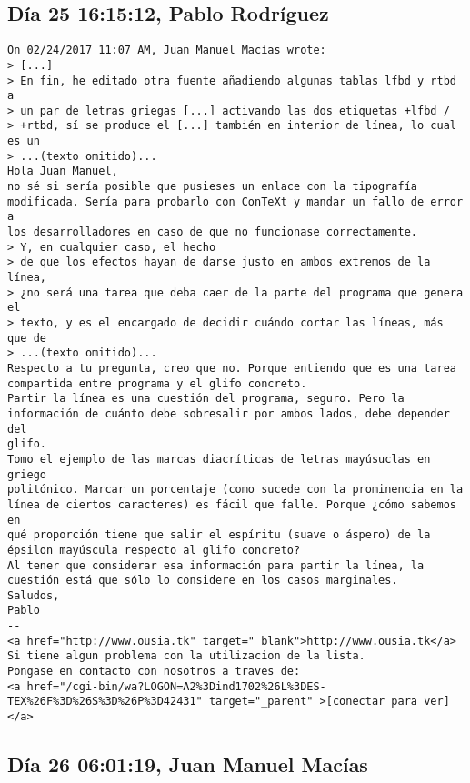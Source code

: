 \documentclass[a4paper,10pt]{article}
\begin{document}
\subsection{Día 25 16:15:12, Pablo Rodríguez}

\begin{lstlisting}
On 02/24/2017 11:07 AM, Juan Manuel Macías wrote:
> [...]
> En fin, he editado otra fuente añadiendo algunas tablas lfbd y rtbd a
> un par de letras griegas [...] activando las dos etiquetas +lfbd /
> +rtbd, sí se produce el [...] también en interior de línea, lo cual es un
> ...(texto omitido)...
Hola Juan Manuel,
no sé si sería posible que pusieses un enlace con la tipografía
modificada. Sería para probarlo con ConTeXt y mandar un fallo de error a
los desarrolladores en caso de que no funcionase correctamente.
> Y, en cualquier caso, el hecho 
> de que los efectos hayan de darse justo en ambos extremos de la línea, 
> ¿no será una tarea que deba caer de la parte del programa que genera el 
> texto, y es el encargado de decidir cuándo cortar las líneas, más que de 
> ...(texto omitido)...
Respecto a tu pregunta, creo que no. Porque entiendo que es una tarea
compartida entre programa y el glifo concreto.
Partir la línea es una cuestión del programa, seguro. Pero la
información de cuánto debe sobresalir por ambos lados, debe depender del
glifo.
Tomo el ejemplo de las marcas diacríticas de letras mayúsuclas en griego
politónico. Marcar un porcentaje (como sucede con la prominencia en la
línea de ciertos caracteres) es fácil que falle. Porque ¿cómo sabemos en
qué proporción tiene que salir el espíritu (suave o áspero) de la
épsilon mayúscula respecto al glifo concreto?
Al tener que considerar esa información para partir la línea, la
cuestión está que sólo lo considere en los casos marginales.
Saludos,
Pablo
-- 
<a href="http://www.ousia.tk" target="_blank">http://www.ousia.tk</a>
Si tiene algun problema con la utilizacion de la lista.
Pongase en contacto con nosotros a traves de:
<a href="/cgi-bin/wa?LOGON=A2%3Dind1702%26L%3DES-TEX%26F%3D%26S%3D%26P%3D42431" target="_parent" >[conectar para ver]</a>

\end{lstlisting}

\subsection{Día 26 06:01:19, Juan Manuel Macías}
\end{document}
